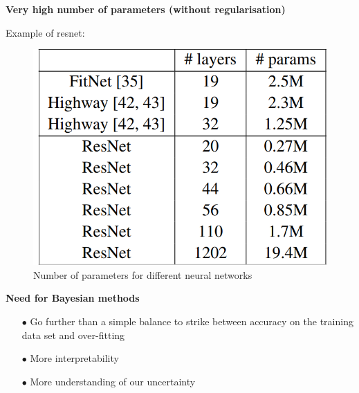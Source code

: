 \documentclass{beamer}
\begin{document}
\begin{frame}
\begin{center}
\textbf{Very high number of parameters (without regularisation)}
\end{center}
Example of resnet: \citep{he2015deep}

\begin{figure}[H]
\centering
\includegraphics[scale=0.20]{high_param.png}
\caption{Number of parameters for different neural networks} 
\label{fig:1}
\end{figure}

\end{frame}

\begin{frame}
\begin{center}
\textbf{Need for Bayesian methods}\\[20 pt]
\end{center}
  \begin{itemize}
    \item[$\bullet$] Go further than a simple balance to strike between accuracy on the training data set and over-fitting\\[8 pt]
    \item[$\bullet$] More interpretability\\[8 pt]
    \item[$\bullet$] More understanding of our uncertainty
  \end{itemize}
\end{frame}
\end{document}
